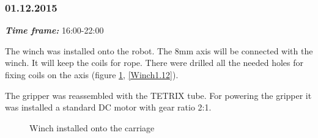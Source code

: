 \subsubsection{01.12.2015}
\textit{\textbf{Time frame:}} 16:00-22:00

The winch was installed onto the robot. The 8mm axis will be connected with the winch. It will keep the coils for rope. There were drilled all the needed holes for fixing coils on the axis (figure \ref{Winch1.11}, \ref{Winch1.12}).

The gripper was reassembled with the TETRIX tube. For powering the gripper it was installed a standard DC motor with gear ratio 2:1.

\begin{figure}[H]
	\begin{minipage}[h]{0.58\linewidth}
		\caption{Winch installed onto the carriage}
		\label{Winch1.11}
	\end{minipage}
	\hfill
	\begin{minipage}[h]{0.37\linewidth}

\end{minipage}
\end{figure}
